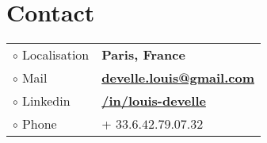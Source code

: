 \section{Contact}
	\begin{tabular} { l l }

	$ \circ $ Localisation & {\bf Paris, France} \\
	$ \circ $ Mail & \href{mailto:develle.louis@gmail.com}{\bf develle.louis@gmail.com} \\
	$ \circ $ Linkedin & \href{https://www.linkedin.com/in/louis-develle/}{\bf /in/louis-develle} \\
	$ \circ $ Phone & + $33.6.42.79.07.32$ \\
	\end{tabular}
\sectionspace %
